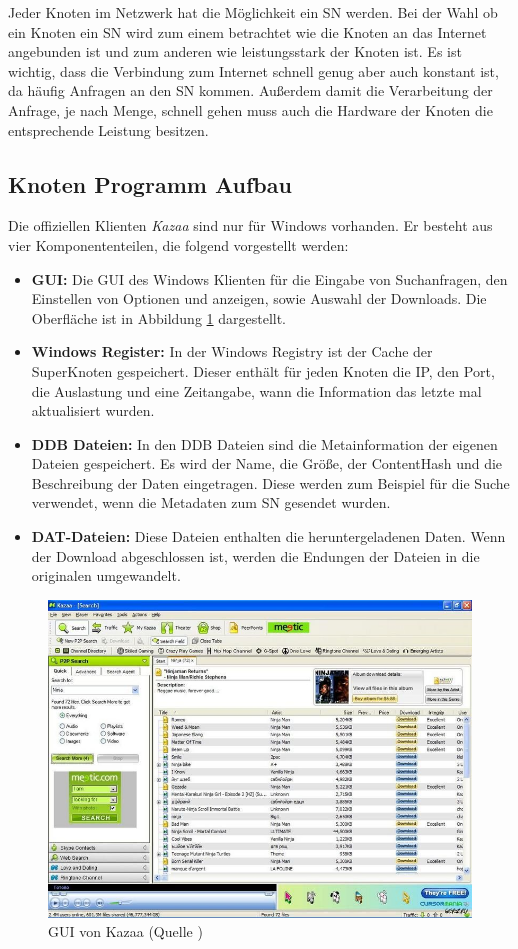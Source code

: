Jeder Knoten im Netzwerk hat die Möglichkeit ein SN werden.
Bei der Wahl ob ein Knoten ein SN wird zum einem betrachtet wie die Knoten an das Internet angebunden ist und zum anderen wie leistungsstark der Knoten ist.
Es ist wichtig, dass die Verbindung zum Internet schnell genug aber auch konstant ist, da häufig Anfragen an den SN kommen.
Außerdem damit die Verarbeitung der Anfrage, je nach Menge, schnell gehen muss auch die Hardware der Knoten die entsprechende Leistung besitzen.

\subsection{Knoten Programm Aufbau}
\label{subsec:proAuf}

Die offiziellen Klienten \textit{Kazaa}\cite{kazaa} sind nur für Windows vorhanden.
Er besteht aus vier Komponententeilen, die folgend vorgestellt werden:

\begin{itemize}
\item[1.] \textbf{GUI:} Die GUI des Windows Klienten für die Eingabe von Suchanfragen, den Einstellen von Optionen und anzeigen, sowie Auswahl der Downloads.
Die Oberfläche ist in Abbildung \ref{fig:kazgui} dargestellt.
\item[2.] \textbf{Windows Register:} In der Windows Registry ist der Cache der SuperKnoten gespeichert.
Dieser enthält für jeden Knoten die IP, den Port, die Auslastung und eine Zeitangabe, wann die Information das letzte mal aktualisiert wurden.
\item[3.] \textbf{DDB Dateien:} In den DDB Dateien sind die Metainformation der eigenen Dateien gespeichert.
Es wird der Name, die Größe, der ContentHash und die Beschreibung der Daten eingetragen.
Diese werden zum Beispiel für die Suche verwendet, wenn die Metadaten zum SN gesendet wurden.
\item[4.] \textbf{DAT-Dateien:} Diese Dateien enthalten die heruntergeladenen Daten.
Wenn der Download abgeschlossen ist, werden die Endungen der Dateien in die originalen umgewandelt.
\end{itemize}

\begin{figure}
\includegraphics[scale=0.3]{gfx/Kazaa-search-big}
\caption{GUI von Kazaa (Quelle \cite{kazaagui})}
\label{fig:kazgui}
\end{figure}


